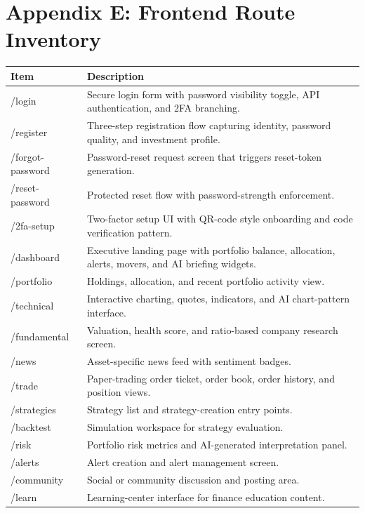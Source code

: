 \documentclass[11pt,a4paper]{article}
\begin{document}
\section*{Appendix E: Frontend Route Inventory}
\begin{longtable}{p{} p{}}
\textbf{Item} & \textbf{Description} \\ \hline
/login & Secure login form with password visibility toggle, API authentication, and 2FA branching. \\
/register & Three-step registration flow capturing identity, password quality, and investment profile. \\
/forgot-password & Password-reset request screen that triggers reset-token generation. \\
/reset-password & Protected reset flow with password-strength enforcement. \\
/2fa-setup & Two-factor setup UI with QR-code style onboarding and code verification pattern. \\
/dashboard & Executive landing page with portfolio balance, allocation, alerts, movers, and AI briefing widgets. \\
/portfolio & Holdings, allocation, and recent portfolio activity view. \\
/technical & Interactive charting, quotes, indicators, and AI chart-pattern interface. \\
/fundamental & Valuation, health score, and ratio-based company research screen. \\
/news & Asset-specific news feed with sentiment badges. \\
/trade & Paper-trading order ticket, order book, order history, and position views. \\
/strategies & Strategy list and strategy-creation entry points. \\
/backtest & Simulation workspace for strategy evaluation. \\
/risk & Portfolio risk metrics and AI-generated interpretation panel. \\
/alerts & Alert creation and alert management screen. \\
/community & Social or community discussion and posting area. \\
/learn & Learning-center interface for finance education content. \\
\end{longtable}
\end{document}
